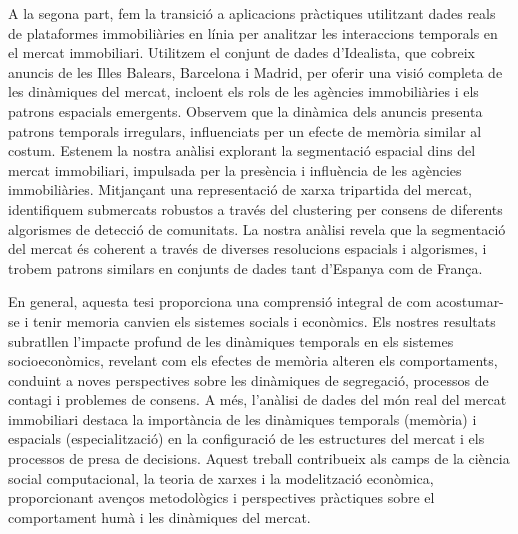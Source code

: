 A la segona part, fem la transició a aplicacions pràctiques utilitzant dades reals de plataformes immobiliàries en línia per analitzar les interaccions temporals en el mercat immobiliari. Utilitzem el conjunt de dades d'Idealista, que cobreix anuncis de les Illes Balears, Barcelona i Madrid, per oferir una visió completa de les dinàmiques del mercat, incloent els rols de les agències immobiliàries i els patrons espacials emergents. Observem que la dinàmica dels anuncis presenta patrons temporals irregulars, influenciats per un efecte de memòria similar al costum. Estenem la nostra anàlisi explorant la segmentació espacial dins del mercat immobiliari, impulsada per la presència i influència de les agències immobiliàries. Mitjançant una representació de xarxa tripartida del mercat, identifiquem submercats robustos a través del clustering per consens de diferents algorismes de detecció de comunitats. La nostra anàlisi revela que la segmentació del mercat és coherent a través de diverses resolucions espacials i algorismes, i trobem patrons similars en conjunts de dades tant d'Espanya com de França.

En general, aquesta tesi proporciona una comprensió integral de com acostumar-se i tenir memoria canvien els sistemes socials i econòmics. Els nostres resultats subratllen l'impacte profund de les dinàmiques temporals en els sistemes socioeconòmics, revelant com els efectes de memòria alteren els comportaments, conduint a noves perspectives sobre les dinàmiques de segregació, processos de contagi i problemes de consens. A més, l'anàlisi de dades del món real del mercat immobiliari destaca la importància de les dinàmiques temporals (memòria) i espacials (especialització) en la configuració de les estructures del mercat i els processos de presa de decisions. Aquest treball contribueix als camps de la ciència social computacional, la teoria de xarxes i la modelització econòmica, proporcionant avenços metodològics i perspectives pràctiques sobre el comportament humà i les dinàmiques del mercat.


\vfill